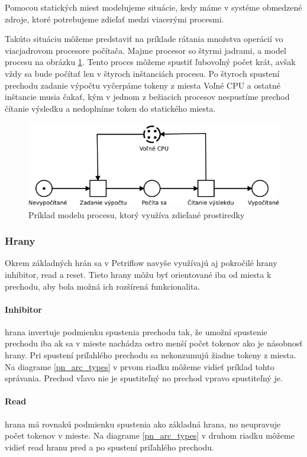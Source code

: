 Pomocou statických miest modelujeme situácie, kedy máme v systéme obmedzené zdroje, ktoré potrebujeme zdieľať medzi viacerými procesmi. 

Takúto situáciu môžeme predstaviť na príklade rátania množstva operácií vo viacjadrovom procesore počítača. Majme procesor so štyrmi jadrami, a model procesu na obrázku \ref{pn_static_place}. Tento proces môžeme spustiť ľubovoľný počet krát, avšak vždy sa bude počítať len v štyroch inštanciách procesu. Po štyroch spustení prechodu zadanie výpočtu vyčerpáme tokeny z miesta Voľné CPU a ostatné inštancie musia čakať, kým v jednom z bežiacich procesov nespustíme prechod čítanie výsledku a nedoplníme token do statického miesta. 


\begin{figure}[!htbp]
\centering
\includegraphics[width=14cm]{img/pn_static_place.png}
\caption{Príklad modelu procesu, ktorý využíva zdieľané prostiredky}
\label{pn_static_place}
\end{figure}


\subsubsection{Hrany}
Okrem základných hrán sa v Petriflow navyše využívajú aj pokročilé hrany inhibitor, read a reset. Tieto hrany môžu byť orientované iba od miesta k prechodu, aby bola možná ich rozšírená funkcionalita.

\paragraph{Inhibitor} hrana invertuje  podmienku spustenia prechodu tak, že umožní spustenie prechodu iba ak sa v mieste nachádza ostro menší počet tokenov ako je násobnosť hrany. Pri spustení priľahlého prechodu sa nekonzumujú žiadne tokeny z miesta. Na diagrame  \ref{pn_arc_types} v prvom riadku môžeme vidieť príklad tohto správania. Prechod vľavo nie je spustiteľný no prechod vpravo spustiteľný je. 

\paragraph{Read} hrana má rovnakú podmienku spustenia ako základná hrana, no neupravuje počet tokenov v mieste. Na diagrame  \ref{pn_arc_types} v druhom riadku môžeme vidieť read hranu pred a po spustení priľahlého prechodu. 
 
